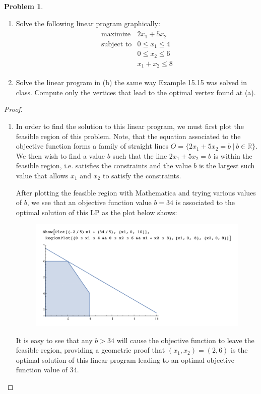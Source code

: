 \documentclass[12pt]{article}
\theoremstyle{definition}
\newtheorem{problem}{Problem}
\begin{document}
\begin{problem}
  \begin{enumerate}
    \item Solve the following linear program graphically:
      \begin{align*}
        \begin{array}{ll}
          \text{maximize} & 2x_1 + 5x_2 \\
          \text{subject to} & 0 \leq x_1 \leq 4 \\
          & 0 \leq x_2 \leq 6 \\
          & x_1 + x_2 \leq 8
        \end{array}
      \end{align*}
    \item Solve the linear program in (b) the same way Example 15.15 was solved in class.
      Compute only the vertices that lead to the optimal vertex found at (a).
  \end{enumerate}
\end{problem}

\begin{proof}
  \begin{enumerate}
    \item In order to find the solution to this linear program, we must first
      plot the feasible region of this problem. Note, that the equation associated
      to the objective function forms a family of straight lines $O = \{2x_1 + 5x_2 = b\ |\ b\in \mathbb{R}\}$.
      We then wish to find a value $b$ such that the line $2x_1 + 5x_2 = b$ is within the
      feasible region, i.e. satisfies the constraints and the value $b$ is the
      largest such value that allows $x_1$ and $x_2$ to satisfy the constraints.

      After plotting the feasible region with Mathematica and trying various values of $b$,
      we see that an objective function value $b=34$ is associated to the optimal solution of this LP
      as the plot below shows:
      \begin{figure}[!h]
        \centerline{\includegraphics[scale=0.9]{geometric_solution}}
      \end{figure}

      It is easy to see that any $b > 34$ will cause the objective function to
      leave the feasible region, providing a geometric proof that $(x_1, x_2) = (2, 6)$
      is the optimal solution of this linear program leading to an optimal objective
      function value of $34$.
  \end{enumerate}
\end{proof}
\end{document}
